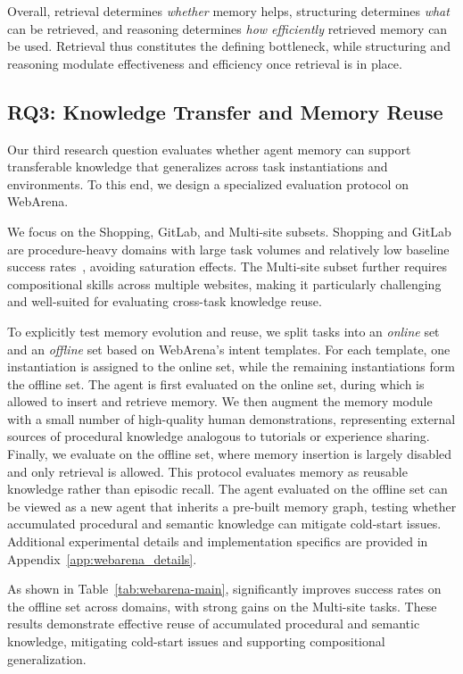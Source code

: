 Overall, retrieval determines \emph{whether} memory helps, structuring determines \emph{what} can be retrieved, and reasoning determines \emph{how efficiently} retrieved memory can be used.
Retrieval thus constitutes the defining bottleneck, while structuring and reasoning modulate effectiveness and efficiency once retrieval is in place.



\subsection{RQ3: Knowledge Transfer and Memory Reuse}
\label{subsec:knowledge_transfer}
Our third research question evaluates whether agent memory can support transferable knowledge that generalizes across task instantiations and environments.
To this end, we design a specialized evaluation protocol on WebArena.

We focus on the Shopping, GitLab, and Multi-site subsets.
Shopping and GitLab are procedure-heavy domains with large task volumes and relatively low baseline success rates~\citep{ICLR2025_f2c6e459}, avoiding saturation effects.
The Multi-site subset further requires compositional skills across multiple websites, making it particularly challenging and well-suited for evaluating cross-task knowledge reuse.

To explicitly test memory evolution and reuse, we split tasks into an \emph{online} set and an \emph{offline} set based on WebArena's intent templates.
For each template, one instantiation is assigned to the online set, while the remaining instantiations form the offline set.
The agent is first evaluated on the online set, during which \plugmem is allowed to insert and retrieve memory.
We then augment the memory module with a small number of high-quality human demonstrations, representing external sources of procedural knowledge analogous to tutorials or experience sharing.
Finally, we evaluate on the offline set, where memory insertion is largely disabled and only retrieval is allowed.
This protocol evaluates memory as reusable knowledge rather than episodic recall.
The agent evaluated on the offline set can be viewed as a new agent that inherits a pre-built memory graph, testing whether accumulated procedural and semantic knowledge can mitigate cold-start issues. Additional experimental details and implementation specifics are provided in Appendix~\ref{app:webarena_details}.

As shown in Table~\ref{tab:webarena-main}, \plugmem significantly improves success rates on the offline set across domains, with strong gains on the Multi-site tasks.
These results demonstrate effective reuse of accumulated procedural and semantic knowledge, mitigating cold-start issues and supporting compositional generalization.

